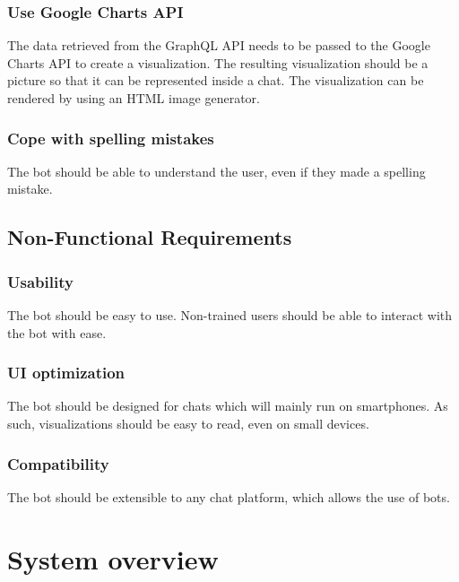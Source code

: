 
\subsubsection{Use Google Charts API}
The data retrieved from the GraphQL API needs to be passed to the Google Charts API to create a visualization. The resulting visualization should be a picture so that it can be represented inside a chat. The visualization can be rendered by using an HTML image generator.

\subsubsection{Cope with spelling mistakes} The bot should be able to understand the user, even if they made a spelling mistake.

\subsection{Non-Functional Requirements}

\subsubsection{Usability} The bot should be easy to use. Non-trained users should be able to interact with the bot with ease.

\subsubsection{UI optimization} The bot should be designed for chats which will mainly run on smartphones. As such, visualizations should be easy to read, even on small devices.

\subsubsection{Compatibility} The bot should be extensible to any chat platform, which allows the use of bots.

\section{System overview}


